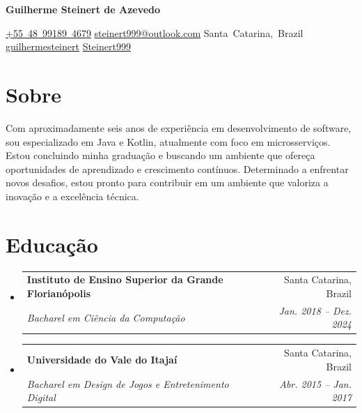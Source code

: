 \documentclass[letterpaper,11pt]{article}
\makeatletter
\newcommand{\resumeSubheading}[4]{
  \vspace{-1pt}\item
    \begin{tabular*}{0.97\textwidth}{l@{\extracolsep{\fill}}r}
      \textbf{#1} & #2 \\
      \textit{\small#3} & \textit{\small #4} \\
    \end{tabular*}\vspace{-5pt}
}
\newcommand{\resumeDescription}[1] {
  \vspace{0.25cm}
  \begin{adjustwidth}{0.5cm}{0.5cm}
    #1
  \end{adjustwidth}
}
\newcommand{\resumeSubHeadingListStart}{\begin{itemize}[leftmargin=*]}
\newcommand{\resumeSubHeadingListEnd}{\end{itemize}}
\newenvironment{header}{
  \setlength{\topsep}{0pt}\par\kern\topsep\centering\color{primaryColor}\linespread{1.5}
}{
  \par\kern\topsep
} %
\let\hrefWithoutArrow\href
\renewcommand{\href}[2]{\hrefWithoutArrow{#1}{\mbox{\ifthenelse{\equal{#2}{}}{ }{#2 }\raisebox{.15ex}{\footnotesize \faExternalLink*}}}}
\makeatother
\begin{document}
\begin{header}
\fontsize{30 pt}{30 pt}
\textbf{Guilherme Steinert de Azevedo}

\vspace{0.3 cm}

\normalsize
\mbox{\hrefWithoutArrow{tel:+5548991894679}{{\footnotesize\faPhone*}\hspace*{0.13cm}+55 48 99189 4679}}
\hspace*{1.25cm}
\mbox{\hrefWithoutArrow{mailto:steinert999@outlook.com}{{\small\faEnvelope[regular]}\hspace*{0.13cm}steinert999@outlook.com}}
\hspace*{1.25cm}
\mbox{{\small\faMapMarker*}\hspace*{0.13cm}Santa Catarina, Brazil}
\hspace*{1.25 cm}
\mbox{\hrefWithoutArrow{https://linkedin.com/in/guilhermesteinert}{{\small\faLinkedinIn}\hspace*{0.13cm}guilhermesteinert}}
\hspace*{1.25 cm}
\mbox{\hrefWithoutArrow{https://github.com/Steinert999}{{\small\faGithub}\hspace*{0.13cm}Steinert999}}
\hspace*{1.25 cm}
\end{header}
\section{Sobre}
\resumeDescription{
 Com aproximadamente seis anos de experiência em desenvolvimento de software, sou especializado em Java e Kotlin, atualmente com foco em microsserviços. Estou concluindo minha graduação e buscando um ambiente que ofereça oportunidades de aprendizado e crescimento contínuos. Determinado a enfrentar novos desafios, estou pronto para contribuir em um ambiente que valoriza a inovação e a excelência técnica.
 }
\section{Educação}
  \resumeSubHeadingListStart
    \resumeSubheading
      {Instituto de Ensino Superior da Grande Florianópolis}{Santa Catarina, Brazil}
      {Bacharel em Ciência da Computação}{Jan. 2018 -- Dez. 2024}
    \resumeSubheading
      {Universidade do Vale do Itajaí}{Santa Catarina, Brazil}
      {Bacharel em Design de Jogos e Entretenimento Digital}{Abr. 2015 -- Jan. 2017}
  \resumeSubHeadingListEnd
\end{document}
